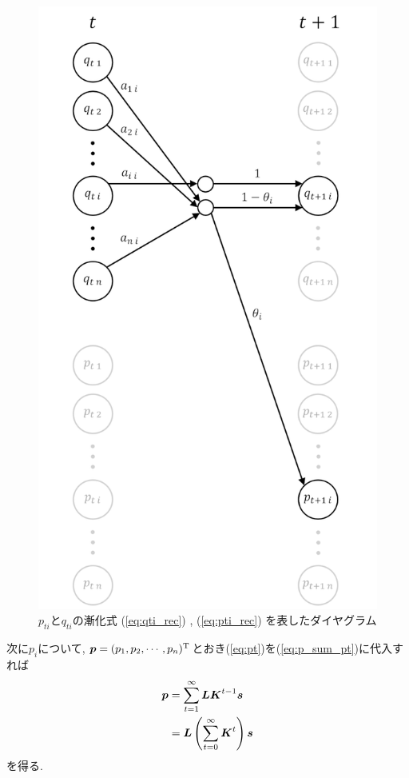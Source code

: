 \begin{figure}[H]
    \begin{center}
        \includegraphics[width=0.7\linewidth]{figs/pq_t.png}
        \caption{$p_{t i}$と$q_{t i}$の漸化式 (\ref{eq:qti_rec}) , (\ref{eq:pti_rec}) を表したダイヤグラム}
        \label{fig:pqt}
    \end{center}
\end{figure}

次に$ p_i $について, $ \boldsymbol{p} = (p_1 , p_2 , \cdots , p_n)^\mathrm{T} $とおき(\ref{eq:pt})を(\ref{eq:p_sum_pt})に代入すれば
\begin{align}
    \boldsymbol{p} &= \sum_{t=1}^{\infty} \boldsymbol{L} \boldsymbol{K}^{t - 1} \boldsymbol{s} \\
    &= \boldsymbol{L} \left( \sum_{t=0}^{\infty} \boldsymbol{K}^t \right) \boldsymbol{s} \label{eq:p_}
\end{align}
を得る. 

